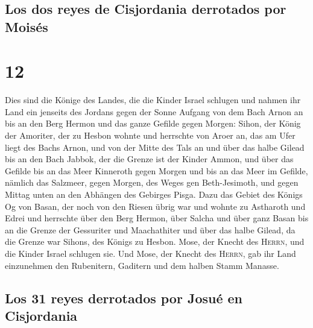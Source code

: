 \hypertarget{los-dos-reyes-de-cisjordania-derrotados-por-moisuxe9s}{%
\subsection{Los dos reyes de Cisjordania derrotados por
Moisés}\label{los-dos-reyes-de-cisjordania-derrotados-por-moisuxe9s}}

\hypertarget{section-11}{%
\section{12}\label{section-11}}

 Dies sind die Könige des Landes, die die Kinder Israel
schlugen und nahmen ihr Land ein jenseits des Jordans gegen der Sonne
Aufgang von dem Bach Arnon an bis an den Berg Hermon und das ganze
Gefilde gegen Morgen:  Sihon, der König der Amoriter, der
zu Hesbon wohnte und herrschte von Aroer an, das am Ufer liegt des Bachs
Arnon, und von der Mitte des Tals an und über das halbe Gilead bis an
den Bach Jabbok, der die Grenze ist der Kinder Ammon,  und
über das Gefilde bis an das Meer Kinneroth gegen Morgen und bis an das
Meer im Gefilde, nämlich das Salzmeer, gegen Morgen, des Weges gen
Beth-Jesimoth, und gegen Mittag unten an den Abhängen des Gebirges
Pisga.  Dazu das Gebiet des Königs Og von Basan, der noch
von den Riesen übrig war und wohnte zu Astharoth und Edrei
 und herrschte über den Berg Hermon, über Salcha und über
ganz Basan bis an die Grenze der Gessuriter und Maachathiter und über
das halbe Gilead, da die Grenze war Sihons, des Königs zu Hesbon.
 Mose, der Knecht des \textsc{Herrn}, und die Kinder
Israel schlugen sie. Und Mose, der Knecht des \textsc{Herrn}, gab ihr
Land einzunehmen den Rubenitern, Gaditern und dem halben Stamm Manasse.

\hypertarget{los-31-reyes-derrotados-por-josuuxe9-en-cisjordania}{%
\subsection{Los 31 reyes derrotados por Josué en
Cisjordania}\label{los-31-reyes-derrotados-por-josuuxe9-en-cisjordania}}

